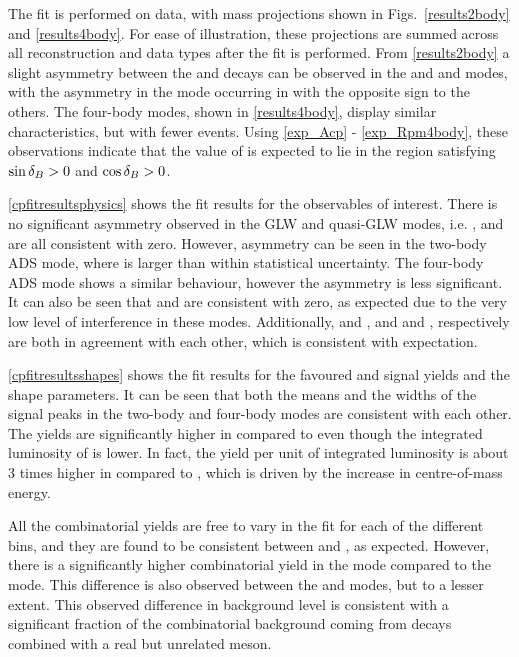 The \CP fit is performed on data, with mass projections shown in Figs.~\ref{results2body} and \ref{results4body}. For ease of illustration, these projections are summed across all \KS reconstruction and data types after the fit is performed. From \fig\ref{results2body} a slight asymmetry between the \Bp and \Bm decays can be observed in the \kk and \pipi and \pik modes, with the asymmetry in the \pik mode occurring in with the opposite sign to the others. The four-body modes, shown in \fig\ref{results4body}, display similar characteristics, but with fewer events. Using \eqns\ref{exp_Acp} - \ref{exp_Rpm4body}, these observations indicate that the value of \deltab is expected to lie in the region satisfying $\sin\delta_B > 0$ and $\cos\delta_B >0$. 

\Tab\ref{cpfitresultsphysics} shows the \CP fit results for the \CP observables of interest. There is no significant asymmetry observed in the GLW and quasi-GLW modes, i.e. \Akk, \Apipi and \Apipipipi are all consistent with zero. However, asymmetry can be seen in the two-body ADS mode, where \Rptwo is larger than \Rmtwo within statistical uncertainty. The four-body ADS mode shows a similar behaviour, however the asymmetry is less significant. It can also be seen that \Akpi and \Akpipipi are consistent with zero, as expected due to the very low level of interference in these modes. Additionally, \Akk and \Apipi, and \Rkk and \Rpipi, respectively are both in agreement with each other, which is consistent with expectation.

\Tab\ref{cpfitresultsshapes} shows the fit results for the favoured \kpi and \kpipipi signal yields and the shape parameters. It can be seen that both the means and the widths of the signal peaks in the two-body and four-body modes are consistent with each other. The yields are significantly higher in \runtwo compared to \runone even though the integrated luminosity of \runtwo is lower. In fact, the yield per unit of integrated luminosity is about 3 times higher in \runone compared to \runtwo, which is driven by the increase in \runtwo centre-of-mass energy. 

All the combinatorial yields are free to vary in the \CP fit for each of the different bins, and they are found to be consistent between \Bm and \Bp, as expected. However, there is a significantly higher combinatorial yield in the \kpi mode compared to the \pik mode. This difference is also observed between the \kpipipi and \pikpipi modes, but to a lesser extent. This observed difference in background level is consistent with a significant fraction of the combinatorial background coming from  decays combined with a real but unrelated \KS meson. 

